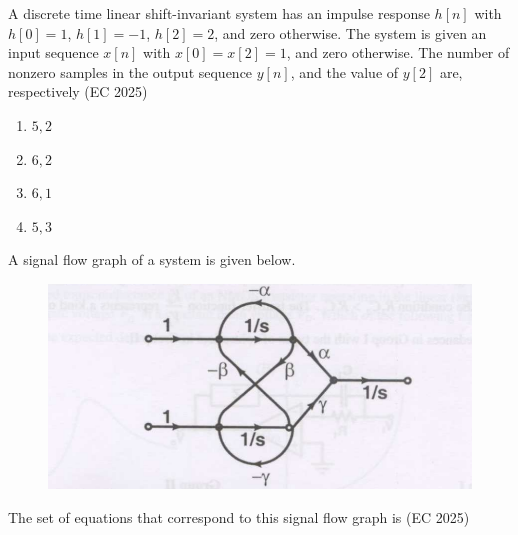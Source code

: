 %
\item A discrete time linear shift-invariant system has an impulse response $h[n]$ with $h[0]=1$, $h[1]=-1$, $h[2]=2$, and zero otherwise. The system is given an input sequence $x[n]$ with $x[0]=x[2]=1$, and zero otherwise. The number of nonzero samples in the output sequence $y[n]$, and the value of $y[2]$ are, respectively
\hfill (EC 2025)
\begin{multicols}{4}
\begin{enumerate}
    \item $5, 2$
    \item $6, 2$
    \item $6, 1$
    \item $5, 3$
\end{enumerate}
\end{multicols}
\item A signal flow graph of a system is given below.
\begin{figure}[H]
	\centering
\includegraphics[width=0.5\columnwidth]{GATE/2008/EC/figs/q40.png}
\caption{}
\label{fig:q40}
\end{figure}
The set of equations that correspond to this signal flow graph is
\hfill (EC 2025)
